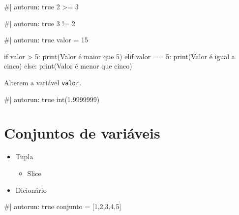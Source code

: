 \documentclass[
  letterpaper,
  DIV=11,
  numbers=noendperiod]{scrreprt}
\newenvironment{Shaded}{\begin{snugshade}}{\end{snugshade}}
\newcommand{\NormalTok}[1]{\textcolor[rgb]{0.00,0.23,0.31}{#1}}
\providecommand{\tightlist}{%
  \setlength{\itemsep}{0pt}\setlength{\parskip}{0pt}}
\begin{document}
\begin{Shaded}
\begin{Highlighting}[]
\NormalTok{\#| autorun: true}
\NormalTok{2 \textgreater{}= 3}
\end{Highlighting}
\end{Shaded}

\begin{Shaded}
\begin{Highlighting}[]
\NormalTok{\#| autorun: true}
\NormalTok{3 != 2}
\end{Highlighting}
\end{Shaded}

\begin{Shaded}
\begin{Highlighting}[]
\NormalTok{\#| autorun: true}
\NormalTok{valor = 15}

\NormalTok{if valor \textgreater{} 5:}
\NormalTok{    print(\textquotesingle{}Valor é maior que 5\textquotesingle{})}
\NormalTok{elif valor == 5:}
\NormalTok{    print(\textquotesingle{}Valor é igual a cinco\textquotesingle{})}
\NormalTok{else:}
\NormalTok{    print(\textquotesingle{}Valor é menor que cinco\textquotesingle{})}
\end{Highlighting}
\end{Shaded}

Alterem a variável \texttt{valor}.

\begin{Shaded}
\begin{Highlighting}[]
\NormalTok{\#| autorun: true}
\NormalTok{int(1.9999999)}
\end{Highlighting}
\end{Shaded}

\section{Conjuntos de variáveis}\label{conjuntos-de-variuxe1veis}

\begin{itemize}
\tightlist
\item
  Tupla

  \begin{itemize}
  \tightlist
  \item
    Slice
  \end{itemize}
\item
  Dicionário
\end{itemize}

\begin{Shaded}
\begin{Highlighting}[]
\NormalTok{\#| autorun: true}
\NormalTok{conjunto = [1,2,3,4,5]}
\end{Highlighting}
\end{Shaded}
\end{document}
